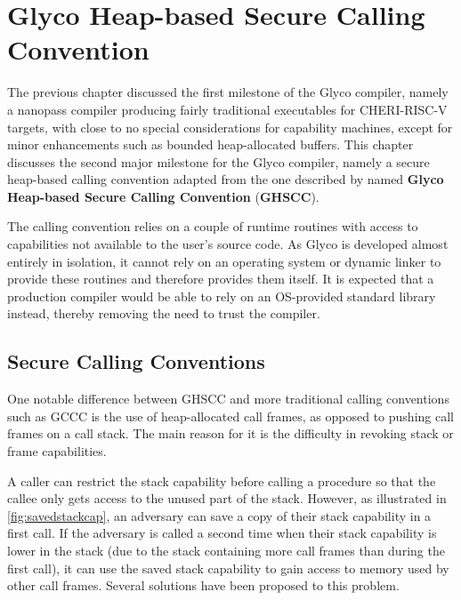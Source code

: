 \documentclass[main.tex]{subfiles}
\begin{document}
\onlyinsubfile{\mainmatter{}}

\chapter{Glyco Heap-based Secure Calling Convention}
The previous chapter discussed the first milestone of the Glyco compiler, namely a nanopass compiler producing fairly traditional executables for CHERI-RISC-V targets, with close to no special considerations for capability machines, except for minor enhancements such as bounded heap-allocated buffers. This chapter discusses the second major milestone for the Glyco compiler, namely a secure heap-based calling convention adapted from the one described by \cite{cerise} named \textbf{Glyco Heap-based Secure Calling Convention} (\textbf{GHSCC}).

The calling convention relies on a couple of runtime routines with access to capabilities not available to the user's source code. As Glyco is developed almost entirely in isolation, it cannot rely on an operating system or dynamic linker to provide these routines and therefore provides them itself. It is expected that a production compiler would be able to rely on an OS-provided standard library instead, thereby removing the need to trust the compiler.

\section{Secure Calling Conventions}
One notable difference between GHSCC and more traditional calling conventions such as GCCC is the use of heap-allocated call frames, as opposed to pushing call frames on a call stack. The main reason for it is the difficulty in revoking stack or frame capabilities.

A caller can restrict the stack capability before calling a procedure so that the callee only gets access to the unused part of the stack. However, as illustrated in \cref{fig:savedstackcap}, an adversary can save a copy of their stack capability in a first call. If the adversary is called a second time when their stack capability is lower in the stack (due to the stack containing more call frames than during the first call), it can use the saved stack capability to gain access to memory used by other call frames. Several solutions have been proposed to this problem.
\end{document}
